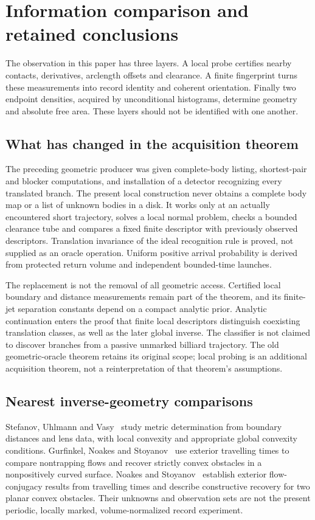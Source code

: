 \section{Information comparison and retained conclusions}
\label{sec:comparison}
The observation in this paper has three layers. A local probe certifies
nearby contacts, derivatives, arclength offsets and clearance. A finite
fingerprint turns these measurements into record identity and coherent
orientation. Finally two endpoint densities, acquired by unconditional
histograms, determine geometry and absolute free area. These layers
should not be identified with one another.

\subsection{What has changed in the acquisition theorem}
The preceding geometric producer was given complete-body listing,
shortest-pair and blocker computations, and installation of a detector
recognizing every translated branch. The present local construction
never obtains a complete body map or a list of unknown bodies in a disk.
It works only at an actually encountered short trajectory, solves a local
normal problem, checks a bounded clearance tube and compares a fixed
finite descriptor with previously observed descriptors. Translation
invariance of the ideal recognition rule is proved, not supplied as an
oracle operation. Uniform positive arrival probability is derived from
protected return volume and independent bounded-time launches.

The replacement is not the removal of all geometric access. Certified
local boundary and distance measurements remain part of the theorem,
and its finite-jet separation constants depend on a compact analytic
prior. Analytic continuation enters the proof that finite local descriptors
distinguish coexisting translation classes, as well as the later global
inverse. The classifier is not claimed to discover branches from a passive
unmarked billiard trajectory. The old geometric-oracle theorem retains
its original scope; local probing is an additional acquisition theorem,
not a reinterpretation of that theorem's assumptions.

\subsection{Nearest inverse-geometry comparisons}
Stefanov, Uhlmann and Vasy~\cite{SUV} study metric determination from
boundary distances and lens data, with local convexity and appropriate
global convexity conditions. Gurfinkel, Noakes and Stoyanov~\cite{GNS}
use exterior travelling times to compare nontrapping flows and recover
strictly convex obstacles in a nonpositively curved surface. Noakes and
Stoyanov~\cite{NS} establish exterior flow-conjugacy results from travelling
times and describe constructive recovery for two planar convex obstacles.
Their unknowns and observation sets are not the present periodic,
locally marked, volume-normalized record experiment.

